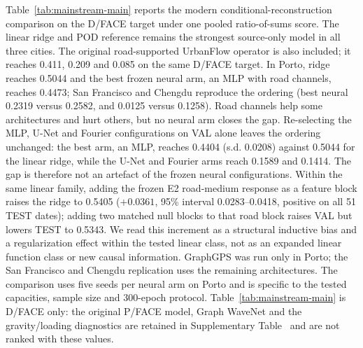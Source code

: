 \documentclass[11pt]{article}
\begin{document}
Table~\ref{tab:mainstream-main} reports the modern conditional-reconstruction comparison on the D/FACE target under one pooled ratio-of-sums score. The linear ridge and POD reference remains the strongest source-only model in all three cities. The original road-supported UrbanFlow operator is also included; it reaches 0.411, 0.209 and 0.085 on the same D/FACE target. In Porto, ridge reaches 0.5044 and the best frozen neural arm, an MLP with road channels, reaches 0.4473; San Francisco and Chengdu reproduce the ordering (best neural 0.2319 versus 0.2582, and 0.0125 versus 0.1258). Road channels help some architectures and hurt others, but no neural arm closes the gap. Re-selecting the MLP, U-Net and Fourier configurations on VAL alone leaves the ordering unchanged: the best arm, an MLP, reaches 0.4404 (s.d. 0.0208) against 0.5044 for the linear ridge, while the U-Net and Fourier arms reach 0.1589 and 0.1414. The gap is therefore not an artefact of the frozen neural configurations. Within the same linear family, adding the frozen E2 road-medium response as a feature block raises the ridge to 0.5405 ($+0.0361$, 95\% interval 0.0283--0.0418, positive on all 51 TEST dates); adding two matched null blocks to that road block raises VAL but lowers TEST to 0.5343. We read this increment as a structural inductive bias and a regularization effect within the tested linear class, not as an expanded linear function class or new causal information. GraphGPS was run only in Porto; the San Francisco and Chengdu replication uses the remaining architectures. The comparison uses five seeds per neural arm on Porto and is specific to the tested capacities, sample size and 300-epoch protocol. Table~\ref{tab:mainstream-main} is D/FACE only: the original P/FACE model, Graph WaveNet and the gravity/loading diagnostics are retained in Supplementary Table~ and are not ranked with these values.
\end{document}

